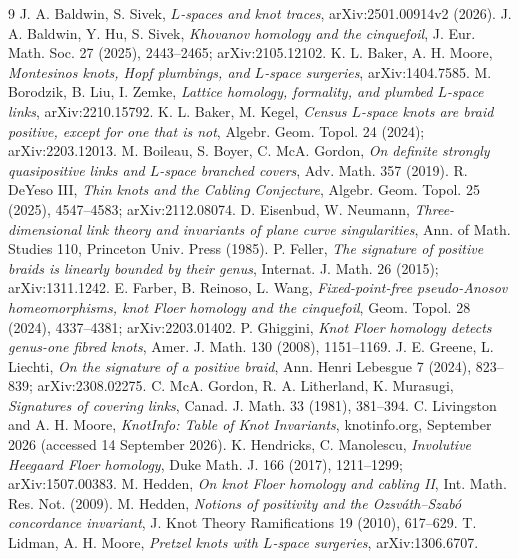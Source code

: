 \documentclass[11pt]{article}
\theoremstyle{definition}
\begin{document}
\begin{thebibliography}{9}
 J. A. Baldwin, S. Sivek, \emph{$L$-spaces and knot traces}, arXiv:2501.00914v2 (2026).
 J. A. Baldwin, Y. Hu, S. Sivek, \emph{Khovanov homology and the cinquefoil}, J. Eur. Math. Soc. 27
(2025), 2443--2465; arXiv:2105.12102.
 K. L. Baker, A. H. Moore, \emph{Montesinos knots, Hopf plumbings, and $L$-space surgeries},
arXiv:1404.7585.
 M. Borodzik, B. Liu, I. Zemke, \emph{Lattice homology, formality, and plumbed $L$-space links},
arXiv:2210.15792.
 K. L. Baker, M. Kegel, \emph{Census $L$-space knots are braid positive, except for one that is not},
Algebr. Geom. Topol. 24 (2024); arXiv:2203.12013.
 M. Boileau, S. Boyer, C. McA. Gordon, \emph{On definite strongly quasipositive links and $L$-space
branched covers}, Adv. Math. 357 (2019).
 R. DeYeso III, \emph{Thin knots and the Cabling Conjecture}, Algebr. Geom. Topol. 25 (2025),
4547--4583; arXiv:2112.08074.
 D. Eisenbud, W. Neumann, \emph{Three-dimensional link theory and invariants of plane curve
singularities}, Ann. of Math. Studies 110, Princeton Univ. Press (1985).
 P. Feller, \emph{The signature of positive braids is linearly bounded by their genus},
Internat. J. Math. 26 (2015); arXiv:1311.1242.
 E. Farber, B. Reinoso, L. Wang, \emph{Fixed-point-free pseudo-Anosov homeomorphisms, knot Floer
homology and the cinquefoil}, Geom. Topol. 28 (2024), 4337--4381; arXiv:2203.01402.
 P. Ghiggini, \emph{Knot Floer homology detects genus-one fibred knots}, Amer. J. Math. 130 (2008),
1151--1169.
 J. E. Greene, L. Liechti, \emph{On the signature of a positive braid},
Ann. Henri Lebesgue 7 (2024), 823--839; arXiv:2308.02275.
 C. McA. Gordon, R. A. Litherland, K. Murasugi, \emph{Signatures of covering links},
Canad. J. Math. 33 (1981), 381--394.
 C. Livingston and A. H. Moore, \emph{KnotInfo: Table of Knot Invariants}, knotinfo.org,
September 2026 (accessed 14 September 2026).
 K. Hendricks, C. Manolescu, \emph{Involutive Heegaard Floer homology}, Duke Math. J. 166 (2017),
1211--1299; arXiv:1507.00383.
 M. Hedden, \emph{On knot Floer homology and cabling II}, Int. Math. Res. Not. (2009).
 M. Hedden, \emph{Notions of positivity and the Ozsv\'ath--Szab\'o concordance invariant},
J. Knot Theory Ramifications 19 (2010), 617--629.
 T. Lidman, A. H. Moore, \emph{Pretzel knots with $L$-space surgeries}, arXiv:1306.6707.

\end{thebibliography}
\end{document}
